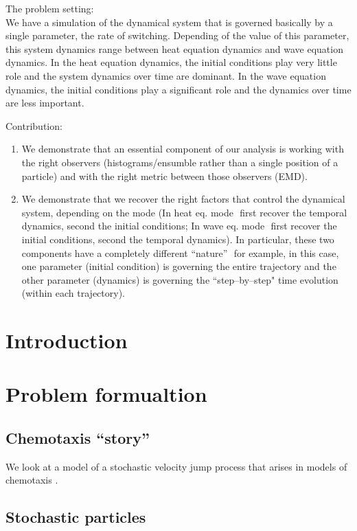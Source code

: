 \documentclass[12pt]{article}
\begin{document}
The problem setting:\\
 We have a simulation of the dynamical system that is governed basically by a single parameter,­ the rate of switching.
 Depending of the value of this parameter, this system dynamics range between heat equation dynamics and wave equation dynamics. 
 In the heat equation dynamics, the initial conditions play very little role and the system dynamics over time are dominant. 
 In the wave equation dynamics, the initial conditions play a significant role and the dynamics over time are less important.


Contribution: 
\begin{enumerate}
\item We demonstrate that an essential component of our analysis is working with the right observers (histograms/ensumble rather than a single position of a particle) and with the right metric between those observers (EMD).
%
\item We demonstrate that we recover the right factors that control the dynamical system, depending on the mode (In heat eq. mode ­ first recover the temporal dynamics, second the initial conditions; In wave eq. mode ­ first recover the initial conditions, second the temporal dynamics). In particular, these two components have a completely different ``nature” ­ for example, in this case, one parameter (initial condition) is governing the entire trajectory and the other parameter (dynamics) is governing the ``step­--by­--step" time evolution (within each trajectory).
\end{enumerate}

\section{Introduction}

\section{Problem formualtion}

\subsection{Chemotaxis ``story''} 
We look at a model of a stochastic velocity jump process that arises in models of chemotaxis \cite{...}.

\subsection{Stochastic particles}
\end{document}
